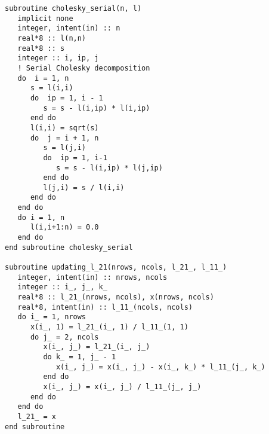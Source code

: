 \begin{lstlisting}
subroutine cholesky_serial(n, l)
   implicit none
   integer, intent(in) :: n
   real*8 :: l(n,n)
   real*8 :: s
   integer :: i, ip, j
   ! Serial Cholesky decomposition
   do  i = 1, n
      s = l(i,i)
      do  ip = 1, i - 1
         s = s - l(i,ip) * l(i,ip)
      end do
      l(i,i) = sqrt(s)
      do  j = i + 1, n
         s = l(j,i)
         do  ip = 1, i-1
            s = s - l(i,ip) * l(j,ip)
         end do
         l(j,i) = s / l(i,i)
      end do
   end do
   do i = 1, n
      l(i,i+1:n) = 0.0
   end do
end subroutine cholesky_serial

subroutine updating_l_21(nrows, ncols, l_21_, l_11_)
   integer, intent(in) :: nrows, ncols
   integer :: i_, j_, k_
   real*8 :: l_21_(nrows, ncols), x(nrows, ncols)
   real*8, intent(in) :: l_11_(ncols, ncols)
   do i_ = 1, nrows
      x(i_, 1) = l_21_(i_, 1) / l_11_(1, 1)
      do j_ = 2, ncols
         x(i_, j_) = l_21_(i_, j_)
         do k_ = 1, j_ - 1
            x(i_, j_) = x(i_, j_) - x(i_, k_) * l_11_(j_, k_)
         end do
         x(i_, j_) = x(i_, j_) / l_11_(j_, j_)
      end do
   end do
   l_21_ = x
end subroutine
\end{lstlisting}

